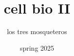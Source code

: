 \documentclass[10pt,a4paper]{article}
\begin{document}
	
	\begin{titlepage}
		\title{cell bio II}
		\author{los tres mosqueteros}
		\date{spring 2025}
		\maketitle
	\end{titlepage}
	
	\setcounter{page}{1} 
	
	\newpage
	
	\tableofcontents
	
	\newpage
	\setcounter{page}{1} 
	
	
	
    
    
    
    
    
    
    
    
    
    

	\newpage
	\printglossary
\end{document}
